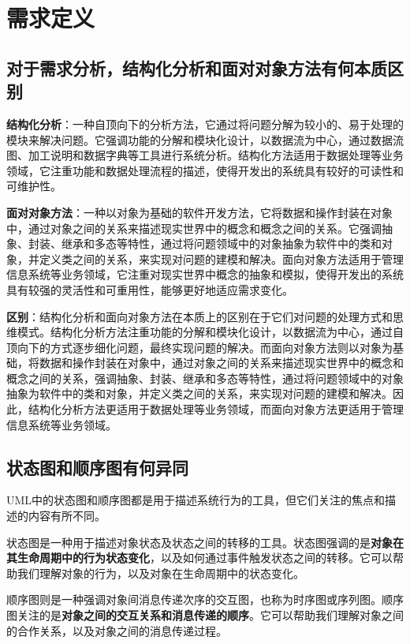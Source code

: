 \documentclass[11pt, a4paper, oneside]{ctexbook}
\begin{document}
\chapter{需求定义}
\section{对于需求分析，结构化分析和面对对象方法有何本质区别}
\textbf{结构化分析}：一种自顶向下的分析方法，它通过将问题分解为较小的、易于处理的模块来解决问题。它强调功能的分解和模块化设计，以数据流为中心，通过数据流图、加工说明和数据字典等工具进行系统分析。结构化方法适用于数据处理等业务领域，它注重功能和数据处理流程的描述，使得开发出的系统具有较好的可读性和可维护性。

\textbf{面对对象方法}：一种以对象为基础的软件开发方法，它将数据和操作封装在对象中，通过对象之间的关系来描述现实世界中的概念和概念之间的关系。它强调抽象、封装、继承和多态等特性，通过将问题领域中的对象抽象为软件中的类和对象，并定义类之间的关系，来实现对问题的建模和解决。面向对象方法适用于管理信息系统等业务领域，它注重对现实世界中概念的抽象和模拟，使得开发出的系统具有较强的灵活性和可重用性，能够更好地适应需求变化。

\textbf{区别}：结构化分析和面向对象方法在本质上的区别在于它们对问题的处理方式和思维模式。结构化分析方法注重功能的分解和模块化设计，以数据流为中心，通过自顶向下的方式逐步细化问题，最终实现问题的解决。而面向对象方法则以对象为基础，将数据和操作封装在对象中，通过对象之间的关系来描述现实世界中的概念和概念之间的关系，强调抽象、封装、继承和多态等特性，通过将问题领域中的对象抽象为软件中的类和对象，并定义类之间的关系，来实现对问题的建模和解决。因此，结构化分析方法更适用于数据处理等业务领域，而面向对象方法更适用于管理信息系统等业务领域。

\section{状态图和顺序图有何异同}
UML中的状态图和顺序图都是用于描述系统行为的工具，但它们关注的焦点和描述的内容有所不同。

状态图是一种用于描述对象状态及状态之间的转移的工具。状态图强调的是\textbf{对象在其生命周期中的行为状态变化}，以及如何通过事件触发状态之间的转移。它可以帮助我们理解对象的行为，以及对象在生命周期中的状态变化。

顺序图则是一种强调对象间消息传递次序的交互图，也称为时序图或序列图。顺序图关注的是\textbf{对象之间的交互关系和消息传递的顺序}。它可以帮助我们理解对象之间的合作关系，以及对象之间的消息传递过程。
\end{document}
